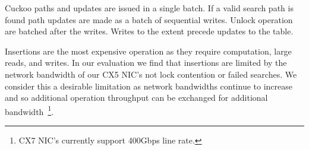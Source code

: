 Cuckoo paths and updates are issued in a single batch. If a
valid search path is found path updates are made as a batch
of sequential writes. Unlock operation are batched after the
writes. Writes to the extent precede updates to the table.

Insertions are the most expensive operation as they require
computation, large reads, and writes. In our evaluation we
find that insertions are limited by the network bandwidth of
our CX5 NIC's not lock contention or failed searches. We
consider this a desirable limitation as network bandwidths
continue to increase and so additional operation throughput
can be exchanged for additional bandwidth~\footnote{CX7
NIC's currently support 400Gbps line rate.}.






